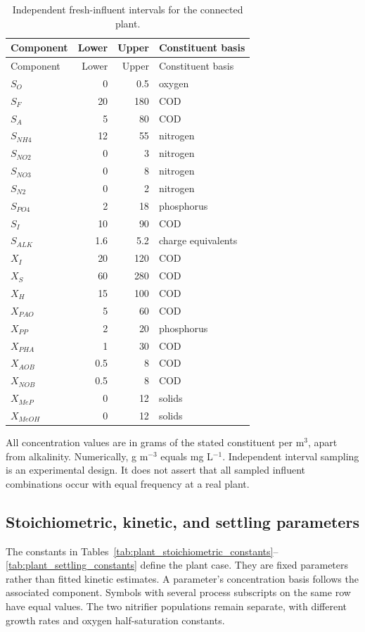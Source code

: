 \begin{longtable}{lrrl}
\caption{Independent fresh-influent intervals for the connected plant.}\label{tab:plant_influent_intervals}\\
\toprule
Component & Lower & Upper & Constituent basis\\
\midrule\endfirsthead
\toprule Component & Lower & Upper & Constituent basis\\\midrule\endhead
$S_O$ & 0 & 0.5 & oxygen\\
$S_F$ & 20 & 180 & COD\\
$S_A$ & 5 & 80 & COD\\
$S_{NH4}$ & 12 & 55 & nitrogen\\
$S_{NO2}$ & 0 & 3 & nitrogen\\
$S_{NO3}$ & 0 & 8 & nitrogen\\
$S_{N2}$ & 0 & 2 & nitrogen\\
$S_{PO4}$ & 2 & 18 & phosphorus\\
$S_I$ & 10 & 90 & COD\\
$S_{ALK}$ & 1.6 & 5.2 & charge equivalents\\
$X_I$ & 20 & 120 & COD\\
$X_S$ & 60 & 280 & COD\\
$X_H$ & 15 & 100 & COD\\
$X_{PAO}$ & 5 & 60 & COD\\
$X_{PP}$ & 2 & 20 & phosphorus\\
$X_{PHA}$ & 1 & 30 & COD\\
$X_{AOB}$ & 0.5 & 8 & COD\\
$X_{NOB}$ & 0.5 & 8 & COD\\
$X_{MeP}$ & 0 & 12 & solids\\
$X_{MeOH}$ & 0 & 12 & solids\\
\bottomrule
\end{longtable}

All concentration values are in grams of the stated constituent per m$^3$, apart from alkalinity. Numerically, g m$^{-3}$ equals mg L$^{-1}$. Independent interval sampling is an experimental design. It does not assert that all sampled influent combinations occur with equal frequency at a real plant.

\subsection{Stoichiometric, kinetic, and settling parameters}

The constants in Tables~\ref{tab:plant_stoichiometric_constants}--\ref{tab:plant_settling_constants} define the plant case. They are fixed parameters rather than fitted kinetic estimates. A parameter's concentration basis follows the associated component. Symbols with several process subscripts on the same row have equal values. The two nitrifier populations remain separate, with different growth rates and oxygen half-saturation constants.

